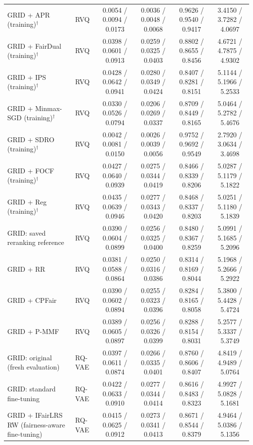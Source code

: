 \begin{table}[p]
{\begin{tabular}{llcccc}
GRID + APR (training)$^{\dagger}$ & RVQ & 0.0054 / 0.0094 / 0.0173 & 0.0036 / 0.0048 / 0.0068 & 0.9626 / 0.9540 / 0.9417 & 3.4150 / 3.7282 / 4.0697 \\
GRID + FairDual (training)$^{\dagger}$ & RVQ & 0.0398 / 0.0601 / 0.0913 & 0.0259 / 0.0325 / 0.0403 & 0.8802 / 0.8655 / 0.8456 & 4.6721 / 4.7875 / 4.9302 \\
GRID + IPS (training)$^{\dagger}$ & RVQ & 0.0428 / 0.0642 / 0.0941 & 0.0280 / 0.0349 / 0.0424 & 0.8407 / 0.8281 / 0.8151 & 5.1144 / 5.1966 / 5.2533 \\
GRID + Minmax-SGD (training)$^{\dagger}$ & RVQ & 0.0330 / 0.0526 / 0.0794 & 0.0206 / 0.0269 / 0.0337 & 0.8709 / 0.8449 / 0.8165 & 5.0464 / 5.2782 / 5.4676 \\
GRID + SDRO (training)$^{\dagger}$ & RVQ & 0.0042 / 0.0081 / 0.0150 & 0.0026 / 0.0039 / 0.0056 & 0.9752 / 0.9692 / 0.9549 & 2.7920 / 3.0634 / 3.4698 \\
GRID + FOCF (training)$^{\dagger}$ & RVQ & 0.0427 / 0.0640 / 0.0939 & 0.0275 / 0.0344 / 0.0419 & 0.8466 / 0.8339 / 0.8206 & 5.0287 / 5.1179 / 5.1822 \\
GRID + Reg (training)$^{\dagger}$ & RVQ & 0.0435 / 0.0639 / 0.0946 & 0.0277 / 0.0343 / 0.0420 & 0.8468 / 0.8337 / 0.8203 & 5.0251 / 5.1180 / 5.1839 \\
GRID: saved reranking reference & RVQ & 0.0390 / 0.0604 / 0.0899 & 0.0256 / 0.0325 / 0.0400 & 0.8480 / 0.8367 / 0.8259 & 5.0991 / 5.1685 / 5.2096 \\
GRID + RR & RVQ & 0.0381 / 0.0588 / 0.0864 & 0.0250 / 0.0316 / 0.0386 & 0.8314 / 0.8169 / 0.8044 & 5.1968 / 5.2666 / 5.2922 \\
GRID + CPFair & RVQ & 0.0390 / 0.0602 / 0.0894 & 0.0255 / 0.0323 / 0.0396 & 0.8284 / 0.8165 / 0.8058 & 5.3800 / 5.4428 / 5.4724 \\
GRID + P-MMF & RVQ & 0.0389 / 0.0605 / 0.0897 & 0.0256 / 0.0326 / 0.0399 & 0.8288 / 0.8154 / 0.8031 & 5.2577 / 5.3337 / 5.3749 \\
\midrule
GRID: original (fresh evaluation) & RQ-VAE & 0.0397 / 0.0611 / 0.0874 & 0.0266 / 0.0335 / 0.0401 & 0.8760 / 0.8606 / 0.8407 & 4.8419 / 4.9489 / 5.0764 \\
GRID: standard fine-tuning & RQ-VAE & 0.0422 / 0.0633 / 0.0910 & 0.0277 / 0.0344 / 0.0414 & 0.8616 / 0.8483 / 0.8323 & 4.9927 / 5.0828 / 5.1681 \\
GRID + IFairLRS RW (fairness-aware fine-tuning) & RQ-VAE & 0.0415 / 0.0625 / 0.0912 & 0.0273 / 0.0341 / 0.0413 & 0.8671 / 0.8544 / 0.8379 & 4.9464 / 5.0386 / 5.1356 \\

\end{tabular}}
\end{table}
